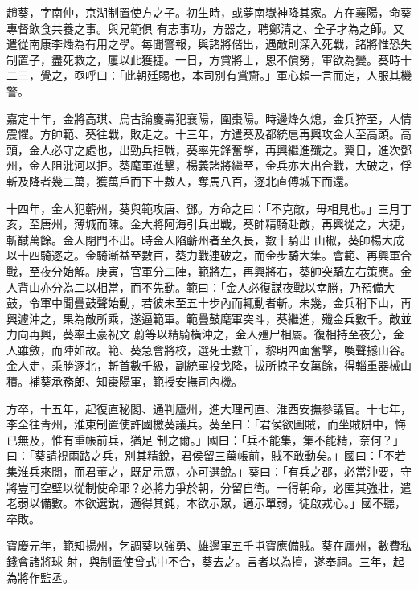 \begin{pinyinscope}
 趙葵，字南仲，京湖制置使方之子。初生時，或夢南嶽神降其家。方在襄陽，命葵專督飲食共養之事。與兄範俱
 有志事功，方器之，聘鄭清之、全子才為之師。又遣從南康李燔為有用之學。每聞警報，與諸將偕出，遇敵則深入死戰，諸將惟恐失制置子，盡死救之，屢以此獲捷。一日，方賞將士，恩不償勞，軍欲為變。葵時十二三，覺之，亟呼曰：「此朝廷賜也，本司別有賞齎。」軍心賴一言而定，人服其機警。



 嘉定十年，金將高琪、烏古論慶壽犯襄陽，圍棗陽。時邊烽久熄，金兵猝至，人情震懼。方帥範、葵往戰，敗走之。十三年，方遣葵及都統扈再興攻金人至高頭。高
 頭，金人必守之處也，出勁兵拒戰，葵率先鋒奮擊，再興繼進殲之。翼日，進次鄧州，金人阻沘河以拒。葵麾軍進擊，楊義諸將繼至，金兵亦大出合戰，大破之，俘斬及降者幾二萬，獲萬戶而下十數人，奪馬八百，逐北直傅城下而還。



 十四年，金人犯蘄州，葵與範攻唐、鄧。方命之曰：「不克敵，毋相見也。」三月丁亥，至唐州，薄城而陳。金大將阿海引兵出戰，葵帥精騎赴敵，再興從之，大捷，斬馘萬餘。金人閉門不出。時金人陷蘄州者至久長，數十騎出
 山椒，葵帥楊大成以十四騎逐之。金騎漸益至數百，葵力戰連破之，而金步騎大集。會範、再興軍合戰，至夜分始解。庚寅，官軍分二陣，範將左，再興將右，葵帥突騎左右策應。金人背山亦分為二以相當，而不先動。範曰：「金人必復謀夜戰以幸勝，乃預備大鼓，令軍中聞疊鼓聲始動，若彼未至五十步內而輒動者斬。未幾，金兵稍下山，再興遽沖之，果為敵所乘，遂逼範軍。範疊鼓麾軍突斗，葵繼進，殲金兵數千。敵並力向再興，葵率土豪祝文
 蔚等以精騎橫沖之，金人殭尸相屬。復相持至夜分，金人雖斂，而陣如故。範、葵急會將校，選死士數千，黎明四面奮擊，喚聲撼山谷。金人走，乘勝逐北，斬首數千級，副統軍投戈降，拔所掠子女萬餘，得輜重器械山積。補葵承務郎、知棗陽軍，範授安撫司內機。



 方卒，十五年，起復直秘閣、通判廬州，進大理司直、淮西安撫參議官。十七年，李全往青州，淮東制置使許國檄葵議兵。葵至曰：「君侯欲圖賊，而坐賊阱中，悔已無及，惟有重帳前兵，猶足
 制之爾。」國曰：「兵不能集，集不能精，奈何？」曰：「葵請視兩路之兵，別其精銳，君侯留三萬帳前，賊不敢動矣。」國曰：「不若集淮兵來閱，而君董之，既足示眾，亦可選銳。」葵曰：「有兵之郡，必當沖要，守將豈可空壁以從制使命耶？必將力爭於朝，分留自衛。一得朝命，必匿其強壯，遣老弱以備數。本欲選銳，適得其鈍，本欲示眾，適示單弱，徒啟戎心。」國不聽，卒敗。



 寶慶元年，範知揚州，乞調葵以強勇、雄邊軍五千屯寶應備賊。葵在廬州，數費私錢會諸將球
 射，與制置使曾式中不合，葵去之。言者以為擅，遂奉祠。三年，起為將作監丞。




\end{pinyinscope}
